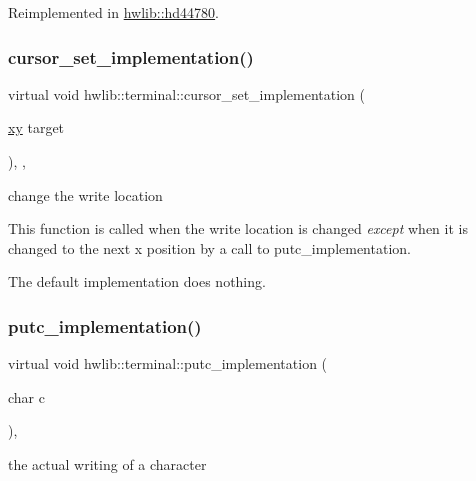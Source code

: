 Reimplemented in \hyperlink{classhwlib_1_1hd44780_a45d4a84c9da66fa350270df482c6e58f}{hwlib\+::hd44780}.

\mbox{\label{classhwlib_1_1terminal_ad4ea7dd275af1f707ce4020cbbc12547}} 
\subsubsection{\texorpdfstring{cursor\+\_\+set\+\_\+implementation()}{cursor\_set\_implementation()}}
{\footnotesize\ttfamily virtual void hwlib\+::terminal\+::cursor\+\_\+set\+\_\+implementation (\begin{DoxyParamCaption}\item[{\hyperlink{classhwlib_1_1xy}{xy}}]{target }\end{DoxyParamCaption})\hspace{0.3cm}{\ttfamily [inline]}, {\ttfamily [protected]}, {\ttfamily [virtual]}}

change the write location

This function is called when the write location is changed {\itshape except} when it is changed to the next x position by a call to putc\+\_\+implementation.

The default implementation does nothing. \mbox{\label{classhwlib_1_1terminal_a9444bf4339b2ac85f8c90abdaaa23f6c}} 
\subsubsection{\texorpdfstring{putc\+\_\+implementation()}{putc\_implementation()}}
{\footnotesize\ttfamily virtual void hwlib\+::terminal\+::putc\+\_\+implementation (\begin{DoxyParamCaption}\item[{char}]{c }\end{DoxyParamCaption})\hspace{0.3cm}{\ttfamily [protected]}, {}}

the actual writing of a character

